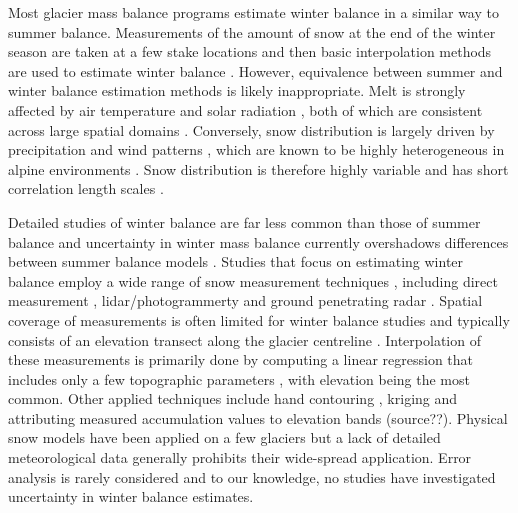 \documentclass[review,oneside, letterpaper]{igs}
\begin{document}
Most glacier mass balance programs estimate winter balance in a similar way to summer balance. Measurements of the amount of snow at the end of the winter season are taken at a few stake locations and then basic interpolation methods are used to estimate winter balance \citep[e.g.][]{Hock1999, MacDougall2011, Cullen2017}. However, equivalence between summer and winter balance estimation methods is likely inappropriate. Melt is strongly affected by air temperature and solar radiation \citep{Hock2005}, both of which are consistent across large spatial domains \citep{Barry1992}. Conversely, snow distribution is largely driven by precipitation \citep{Lehning2008} and wind patterns \citep{Bernhardt2009, Musselman2015}, which are known to be highly heterogeneous in alpine environments \citep{Barry1992}. Snow distribution is therefore highly variable and has short correlation length scales \citep[e.g.][]{Anderton2004, Egli2011, Grunewald2010, Helbig2017, Lopez2011, Lopez2013, Machguth2006, Marshall2006}. 

Detailed studies of winter balance are far less common than those of summer balance and uncertainty in winter mass balance currently overshadows differences between summer balance models \citep{Reveillet2016}. Studies that focus on estimating winter balance  employ a wide range of snow measurement techniques \citep{Sold2013}, including direct measurement \citep[e.g.][]{Cullen2017}, lidar/photogrammerty \citep[e.g.][]{Sold2013} and ground penetrating radar \citep[e.g.][]{Machguth2006, Gusmeroli2014, McGrath2015}. Spatial coverage of measurements is often limited for winter balance studies and typically consists of an elevation transect along the glacier centreline \citep[e.g.][]{Kaser2003, Machguth2006}. Interpolation of these measurements is primarily done by computing a linear regression that includes only a few topographic parameters \citep[e.g.][]{MacDougall2011}, with elevation being the most common. Other applied techniques include hand contouring \citep[e.g.][]{Tangborn1975}, kriging \citep[e.g.][]{Hock1999} and attributing measured accumulation values to elevation bands (source??). Physical snow models have been applied on a few glaciers \citep{Mott2008, Dadic2010} but a lack of detailed meteorological data generally prohibits their wide-spread application. Error analysis is rarely considered and to our knowledge, no studies have investigated uncertainty in winter balance estimates. 
\end{document}
